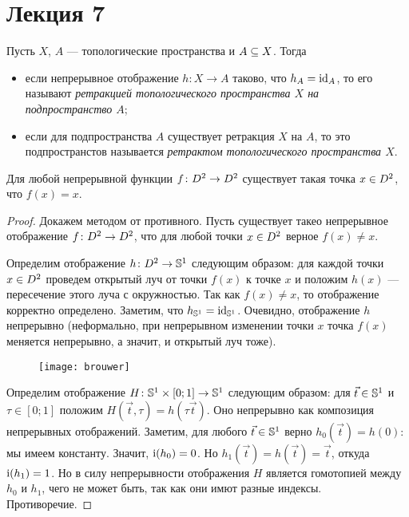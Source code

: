 \documentclass[main]{subfiles}
\begin{document}
\section{Лекция 7}

\begin{definition}
	Пусть $ X $, $ A $ --- топологические пространства и $ A \ssq X $. Тогда
	\begin{itemize}
		\item если непрерывное отображение $ h \colon X \to A $ таково, что $ h_A = \Id_A $,
			то его называют \emph{ретракцией топологического пространства $ X $ на подпространство $ A $};
		\item если для подпространства $ A $ существует ретракция $ X $ на $ A $, то это подпространстов называется
			\emph{ретрактом топологического пространства $ X $}.
	\end{itemize}
\end{definition}

\begin{theorem}[Бр\'{а}уэра]
	Для любой непрерывной функции $ f \colon \D^2 \to \D^2 $ существует такая точка $ x \in \D^2 $, что $ f(x) = x $.
\end{theorem}

\begin{proof}
	Докажем методом от противного. Пусть существует такео непрерывное отображение $ f \colon \D^2 \to \D^2 $,
	что для любой точки $ x \in \D^2 $ верное $ f(x) \neq x $.

	Определим отображение $ h  \colon \D^2 \to \S^1 $ следующим образом: для каждой точки $ x \in \D^2 $ проведем
	открытый луч от точки $ f(x) $ к точке $ x $ и положим $ h(x) $ --- пересечение этого луча с окружностью.
	Так как $ f(x) \neq x $, то отображение корректно определено. Заметим, что $ h_{\S^1} = \Id_{\S^1} $.
	Очевидно, отображение $ h $ непрерывно (неформально, при непрерывном изменении точки $ x $ точка $ f(x) $
	меняется непрерывно, а значит, и открытый луч тоже).

	\begin{figure}[H]
		\centering \texttt{[image: brouwer]}
	\end{figure}

	Определим отображение $ H \colon \S^1 \times [0;1] \to \S^1 $ следующим образом: для $ \vec{t} \in \S^1 $ и
	$ \tau \in [0;1] $ положим $ H(\vec{t}, \tau) = h(\tau \vec{t}) $. Оно непрерывно как композиция непрерывных
	отображений. Заметим, для любого $ \vec{t} \in \S^1 $ верно $ h_0(\vec{t}) = h(0) $:
	мы имеем константу. Значит, $ \Ind(h_0) = 0 $. Но $ h_1(\vec{t}) = h(\vec{t}) = \vec{t} $, откуда
	$ \Ind(h_1) = 1 $. Но в силу непрерывности отображения $ H $ является гомотопией между $ h_0 $ и $ h_1 $, чего
	не может быть, так как они имют разные индексы. Противоречие.
\end{proof}
\end{document}
